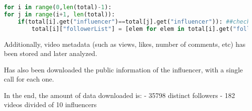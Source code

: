 \begin{lstlisting}[language=Python]
for i in range(0,len(total)-1):
for j in range(i+1, len(total)):
    if(total[i].get("influencer")==total[j].get("influencer")): ##check if the same influencer (we don't want to remove common followers)
        total[i]["followerList"] = [elem for elem in total[i].get("followerList") if elem not in total[j].get("followerList")]
\end{lstlisting}

Additionally, video metadata (such as views, likes, number of comments, etc) has been stored and later analyzed.

Has also been downloaded the public information of the influencer, with a single call for each one.

In the end, the amount of data downloaded is:
- 35798 distinct followers
- 182 videos divided of 10 influencers
